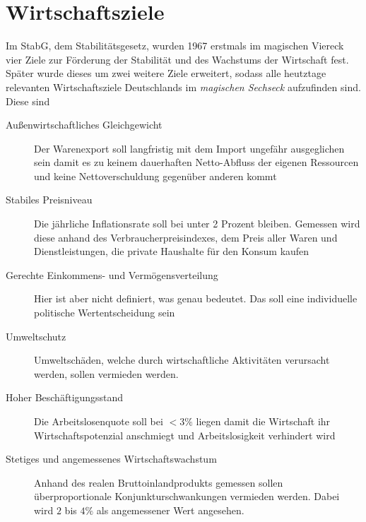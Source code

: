 \documentclass{article}
\begin{document}
 
 
\section{Wirtschaftsziele}
Im StabG, dem Stabilitätsgesetz, wurden 1967 erstmals im magischen Viereck vier Ziele zur Förderung der Stabilität und des Wachstums der Wirtschaft fest. Später wurde dieses um zwei weitere Ziele erweitert, sodass alle heutztage relevanten Wirtschaftsziele Deutschlands im \emph{magischen Sechseck} aufzufinden sind. Diese sind
\begin{description}
 \item[Außenwirtschaftliches Gleichgewicht] Der Warenexport soll langfristig mit dem Import ungefähr ausgeglichen sein damit es zu keinem dauerhaften Netto-Abfluss der eigenen Ressourcen und keine Nettoverschuldung gegenüber anderen kommt
 \item[Stabiles Preisniveau] Die jährliche Inflationsrate soll bei unter 2 Prozent bleiben. Gemessen wird diese anhand des Verbraucherpreisindexes, dem Preis aller Waren und Dienstleistungen, die private Haushalte für den Konsum kaufen
 \item[Gerechte Einkommens- und Vermögensverteilung] Hier ist aber nicht definiert, was genau  bedeutet. Das soll eine individuelle politische Wertentscheidung sein
 \item[Umweltschutz] Umweltschäden, welche durch wirtschaftliche Aktivitäten verursacht werden, sollen vermieden werden.
 \item[Hoher Beschäftigungsstand] Die Arbeitslosenquote soll bei $<3\%$ liegen damit die Wirtschaft ihr Wirtschaftspotenzial anschmiegt und Arbeitslosigkeit verhindert wird
 \item[Stetiges und angemessenes Wirtschaftswachstum] Anhand des realen Bruttoinlandprodukts gemessen sollen überproportionale Konjunkturschwankungen vermieden werden. Dabei wird $2$ bis $4\%$ als angemessener Wert angesehen.  
\end{description}
 
\end{document}
